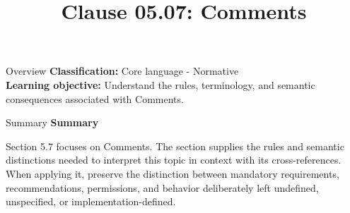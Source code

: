 \documentclass[10pt,letterpaper]{article}
\title{Clause 05.07: Comments}
\author{}
\date{}
\begin{document}
\maketitle
\begin{CornellOverviewBox}{Overview}
\textbf{Classification:} Core language - Normative\\[2pt]
\textbf{Learning objective:} Understand the rules, terminology, and semantic consequences associated with Comments.
\end{CornellOverviewBox}\begin{CornellSummaryBox}{Summary}
{\sffamily\bfseries\color{Accent} Summary}\par\vspace{3pt}Section 5.7 focuses on Comments. The section supplies the rules and semantic distinctions needed to interpret this topic in context with its cross-references. When applying it, preserve the distinction between mandatory requirements, recommendations, permissions, and behavior deliberately left undefined, unspecified, or implementation-defined.
\end{CornellSummaryBox}
\end{document}
